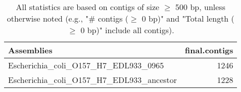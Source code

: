 \documentclass[12pt,a4paper]{article}
\begin{document}
\begin{table}[ht]
\begin{center}
\caption{All statistics are based on contigs of size $\geq$ 500 bp, unless otherwise noted (e.g., "\# contigs ($\geq$ 0 bp)" and "Total length ($\geq$ 0 bp)" include all contigs).}
\begin{tabular}{|l*{1}{|r}|}
\hline
Assemblies & final.contigs \\ \hline
Escherichia\_coli\_O157\_H7\_EDL933\_0965 & 1246 \\ \hline
Escherichia\_coli\_O157\_H7\_EDL933\_ancestor & 1228 \\ \hline
\end{tabular}
\end{center}
\end{table}
\end{document}
